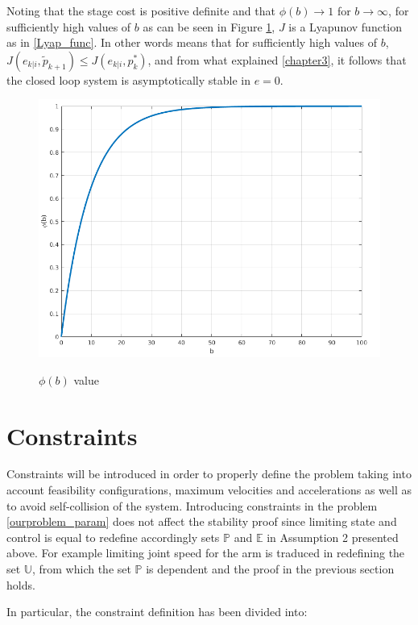 Noting that the stage cost is positive definite and that $\phi(b) \rightarrow 1$ for $b \rightarrow \infty$, for sufficiently high values of $b$ as can be seen in Figure \ref{phito1}, $J$ is a Lyapunov function as in \ref{Lyap_func}. In other words means that for sufficiently high values of $b$, $J({e}_{k|i},\tilde{p}_{k+1})\le J({e}_{k|i},p_{k}^*)$, and from what explained \ref{chapter3}, it follows that the closed loop system is asymptotically stable in $e=0$.
\begin{figure}[h!]
\centering
\includegraphics[scale=0.25]{IMMAGINI/phito1.png}
\label{phito1}
\caption{$\phi(b)$ value}
\end{figure}


\section{Constraints}

Constraints will be introduced in order to properly define the problem taking into account feasibility configurations, maximum velocities and accelerations as well as to avoid self-collision of the system. Introducing constraints in the problem \ref{ourproblem_param} does not affect the stability proof since limiting state and control is equal to redefine accordingly sets $\mathbb{P}$ and $\mathbb{E}$ in Assumption 2 presented above. For example limiting joint speed for the arm is traduced in redefining the set $\mathbb{U}$, from which the set $\mathbb{P}$ is dependent and the proof in the previous section holds.

In particular, the constraint definition has been divided into: 

